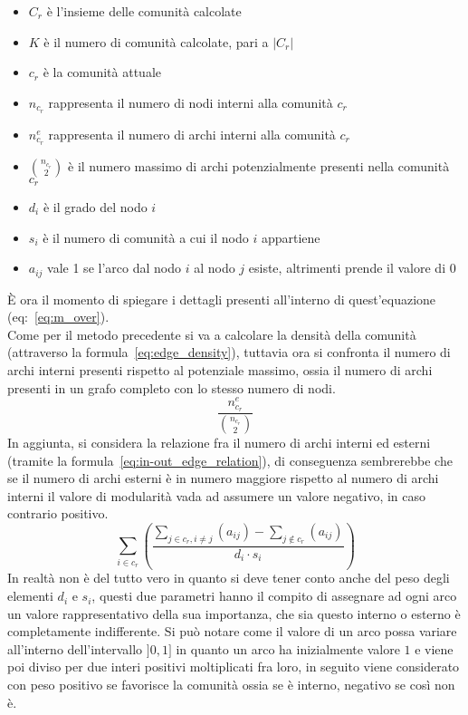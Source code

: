\begin{itemize}
	\item $C_r$ è l'insieme delle comunità calcolate
	\item $K$ è il numero di comunità calcolate, pari a $|C_r|$
	\item $c_r$ è la comunità attuale
	\item $n_{c_r}$ rappresenta il numero di nodi interni alla comunità $c_r$
	\item $n^e_{c_r}$ rappresenta il numero di archi interni alla comunità $c_r$
	\item $\binom{n_{c_r}}{2}$ è il numero massimo di archi potenzialmente presenti nella comunità $c_r$
	\item $d_i$ è il grado del nodo $i$
	\item $s_i$ è il numero di comunità a cui il nodo $i$ appartiene
	\item $a_{ij}$ vale 1 se l'arco dal nodo $i$ al nodo $j$ esiste, altrimenti prende il valore di 0
\end{itemize}
È ora il momento di spiegare i dettagli presenti all'interno di quest'equazione (eq:~\ref{eq:m_over}).\\
Come per il metodo precedente si va a calcolare la densità della comunità (attraverso la formula~\ref{eq:edge_density}), tuttavia ora si confronta il numero di archi interni presenti rispetto al potenziale massimo, ossia il numero di archi presenti in un grafo completo con lo stesso numero di nodi.
\begin{equation}
	\frac{ n^e_{c_r} }{ \binom{n_{c_r}}{2} }
	\label{eq:edge_density}
\end{equation}
%
In aggiunta, si considera la relazione fra il numero di archi interni ed esterni (tramite la formula~\ref{eq:in-out_edge_relation}), di conseguenza sembrerebbe che se il numero di archi esterni è in numero maggiore rispetto al numero di archi interni il valore di modularità vada ad assumere un valore negativo, in caso contrario positivo.\\
\begin{equation}
	\sum\limits_{i \in c_r} \left( \frac{
		\sum\limits_{j \in c_r, i \neq j} \left( a_{ij} \right) - 
		\sum\limits_{j \notin c_r} \left( a_{ij} \right) 
	} {d_i \cdot s_i} \right)
	\label{eq:in-out_edge_relation}
\end{equation}
In realtà non è del tutto vero in quanto si deve tener conto anche del peso degli elementi $d_i$ e $s_i$, questi due parametri hanno il compito di assegnare ad ogni arco un valore rappresentativo della sua importanza, che sia questo interno o esterno è completamente indifferente. Si può notare come il valore di un arco possa variare all'interno dell'intervallo $]0, 1]$ in quanto un arco ha inizialmente valore $1$ e viene poi diviso per due interi positivi moltiplicati fra loro, in seguito viene considerato con peso positivo se favorisce la comunità ossia se è interno, negativo se così non è.\\
